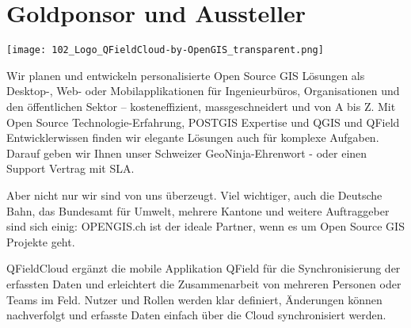 \section*{Goldponsor und Aussteller}
\begin{center}
  \texttt{[image: 102\_Logo\_QFieldCloud-by-OpenGIS\_transparent.png]}
\end{center}
Wir planen und entwickeln personalisierte Open Source GIS Lösungen als Desktop-, Web- oder Mobilapplikationen für Ingenieurbüros, Organisationen und den öffentlichen Sektor – kosteneffizient, massgeschneidert und von A bis Z. Mit Open Source Technologie-Erfahrung, POSTGIS Expertise und QGIS und QField Entwicklerwissen finden wir elegante Lösungen auch für komplexe Aufgaben. Darauf geben wir Ihnen unser Schweizer GeoNinja-Ehrenwort - oder einen Support Vertrag mit SLA.

Aber nicht nur wir sind von uns überzeugt. Viel wichtiger, auch die Deutsche Bahn, das Bundesamt für Umwelt, mehrere Kantone und weitere Auftraggeber sind sich einig: OPENGIS.ch ist der ideale Partner, wenn es um Open Source GIS Projekte geht.

QFieldCloud ergänzt die mobile Applikation QField für die Synchronisierung der erfassten Daten und erleichtert die Zusammenarbeit von mehreren Personen oder Teams im Feld. Nutzer und Rollen werden klar definiert, Änderungen können nachverfolgt und erfasste Daten einfach über die Cloud synchronisiert werden.

